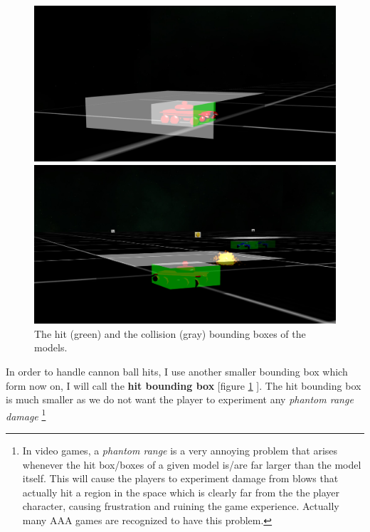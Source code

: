 \documentclass[14pt]{article}
\begin{document}
\begin{figure}[H]
\begin{minipage}[t]{0.5\textwidth}
\center
\includegraphics[width=\textwidth]{images/boundingBoxes.png}
\end{minipage}
\hfill
\begin{minipage}[t]{0.5\textwidth}
\center
\includegraphics[width=\textwidth]{images/boundingBoxes2.png}
\end{minipage} 
\caption{The hit (green) and the collision (gray) bounding boxes of the models.}
\label{img:boundingBoxes}
\end{figure}


In order to handle cannon ball hits, I use another smaller bounding box which form now on, I will call the \textbf{hit bounding box} [figure \ref{img:boundingBoxes} ]. The hit bounding box is much smaller as we do not want the player to experiment any \textit{phantom range damage}
\footnote{In video games, a \textit{phantom range} is a very annoying problem that arises whenever the hit box/boxes of a given model is/are far larger than the model itself. This will cause the players to experiment damage from blows that actually hit a region in the space which is clearly far from the the player character, causing frustration and ruining the game experience. Actually many AAA games are recognized to have this problem.}
\end{document}
